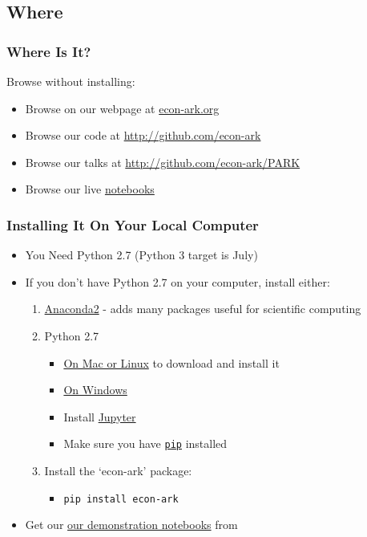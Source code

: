 \documentclass[public]{beamer}
\providecommand{\EconARK}{\href{http://econ-ark.org}{econ-ark.org}}
\begin{document}
\subsection{Where}
\begin{frame}
  \frametitle{Where Is It?}

  Browse without installing:
  \begin{itemize}
  \item Browse on our webpage at \EconARK
  \item Browse our code at \phantom{}\href{http://github.com/econ-ark}{http://github.com/econ-ark} 
  \item Browse our talks at \href{http://github.com/econ-ark}{http://github.com/econ-ark/PARK} 
  \item Browse our live \href{https://econ-ark.org/notebooks}{notebooks} 
  \end{itemize}
\end{frame}
\begin{frame}
  \frametitle{Installing It On Your Local Computer}

  \begin{itemize}
  \item You Need Python 2.7 (Python 3 target is  July)
  \item If you don't have Python 2.7 on your computer, install either:
    \begin{enumerate}
    \item \href{https://www.anaconda.com/download/}{Anaconda2} - adds many packages useful for scientific computing
    \item Python 2.7
      \begin{itemize}
      \item \href{https://www.python.org/downloads/release/python-2715/}{On Mac or Linux} to download and install it
      \item \href{http://docs.python-guide.org/en/latest/starting/install/win/}{On Windows}
      \item Install \href{https://jupyter.org/install}{Jupyter}
      \item Make sure you have \href{https://packaging.python.org/tutorials/installing-packages/}{\texttt{pip}} installed
      \end{itemize}
    \item Install the `econ-ark' package:
      \begin{itemize}
      \item \texttt{pip install econ-ark}
      \end{itemize}
    \end{enumerate}
  \item  \pause Get our \href{http://econ-ark.org/notebooks}{our demonstration notebooks} from 
  \end{itemize}
\end{frame}
\end{document}
